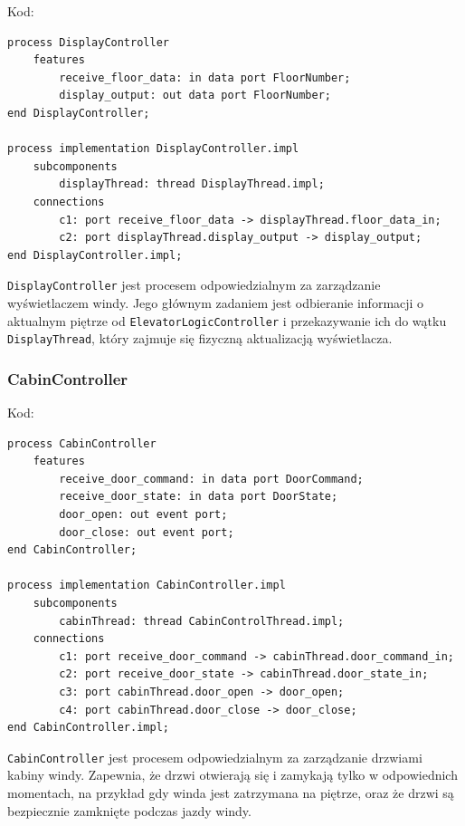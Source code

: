 \documentclass{article}
\begin{document}
    Kod:
    
    \begin{lstlisting}[basicstyle=\ttfamily, keywordstyle=\bfseries]
process DisplayController
    features
        receive_floor_data: in data port FloorNumber;
        display_output: out data port FloorNumber;
end DisplayController;

process implementation DisplayController.impl
    subcomponents
        displayThread: thread DisplayThread.impl;
    connections
        c1: port receive_floor_data -> displayThread.floor_data_in;
        c2: port displayThread.display_output -> display_output;
end DisplayController.impl;
    \end{lstlisting}

    \texttt{DisplayController} jest procesem odpowiedzialnym za zarządzanie wyświetlaczem windy. Jego głównym zadaniem jest odbieranie informacji o aktualnym piętrze od \texttt{ElevatorLogicController} i przekazywanie ich do wątku \texttt{DisplayThread}, który zajmuje się fizyczną aktualizacją wyświetlacza.





    \subsubsection{CabinController}

    Kod:
    
    \begin{lstlisting}[basicstyle=\ttfamily, keywordstyle=\bfseries]
process CabinController
    features
        receive_door_command: in data port DoorCommand;
        receive_door_state: in data port DoorState;
        door_open: out event port;
        door_close: out event port;
end CabinController;

process implementation CabinController.impl
    subcomponents
        cabinThread: thread CabinControlThread.impl;
    connections
        c1: port receive_door_command -> cabinThread.door_command_in;
        c2: port receive_door_state -> cabinThread.door_state_in;
        c3: port cabinThread.door_open -> door_open;
        c4: port cabinThread.door_close -> door_close;
end CabinController.impl;
    \end{lstlisting}

    \texttt{CabinController} jest procesem odpowiedzialnym za zarządzanie drzwiami kabiny windy. Zapewnia, że drzwi otwierają się i zamykają tylko w odpowiednich momentach, na przykład gdy winda jest zatrzymana na piętrze, oraz że drzwi są bezpiecznie zamknięte podczas jazdy windy.
\end{document}
